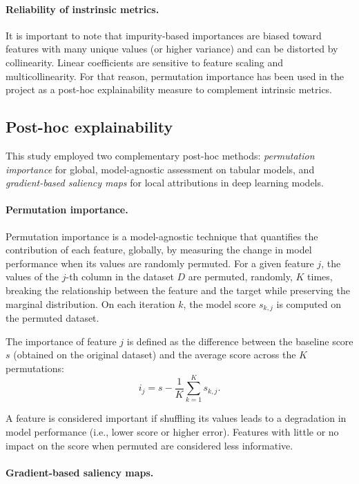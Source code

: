\paragraph{Reliability of instrinsic metrics.}
It is important to note that impurity-based importances are biased toward features with many unique values (or higher variance) and can be distorted by collinearity. Linear coefficients are sensitive to feature scaling and multicollinearity. For that reason, permutation importance has been used in the project as a post-hoc explainability measure to complement intrinsic metrics.

\subsection{Post-hoc explainability}\label{subsec:method-posthoc-explainability}
This study employed two complementary post-hoc methods: \emph{permutation importance} for global, model-agnostic assessment on tabular models, and \emph{gradient-based saliency maps} for local attributions in deep learning models.

\paragraph{Permutation importance.}  

Permutation importance \citep{Breiman2001,Fisher2018} is a model-agnostic technique that quantifies the contribution of each feature, globally, by measuring the change in model performance when its values are randomly permuted. For a given feature $j$, the values of the $j$-th column in the dataset $D$ are permuted, randomly, $K$ times, breaking the relationship between the feature and the target while preserving the marginal distribution. On each iteration $k$, the model score $s_{k,j}$ is computed on the permuted dataset.  

The importance of feature $j$ is defined as the difference between the baseline score $s$ (obtained on the original dataset) and the average score across the $K$ permutations:  
\[
i_j = s - \frac{1}{K}\sum_{k=1}^{K} s_{k,j}.
\]  

A feature is considered important if shuffling its values leads to a degradation in model performance (i.e., lower score or higher error). Features with little or no impact on the score when permuted are considered less informative.


\paragraph{Gradient-based saliency maps.}  

